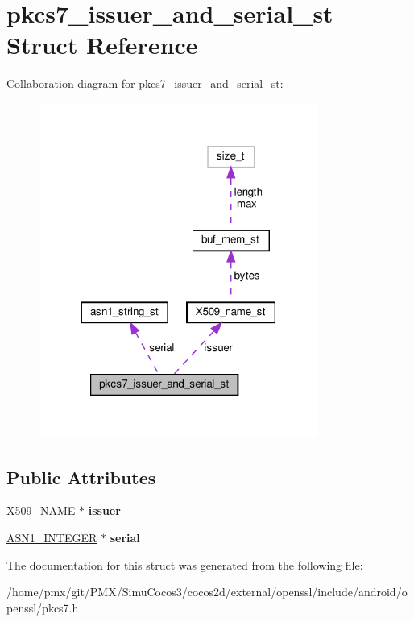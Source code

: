 \hypertarget{structpkcs7__issuer__and__serial__st}{}\section{pkcs7\+\_\+issuer\+\_\+and\+\_\+serial\+\_\+st Struct Reference}
\label{structpkcs7__issuer__and__serial__st}


Collaboration diagram for pkcs7\+\_\+issuer\+\_\+and\+\_\+serial\+\_\+st\+:
\nopagebreak
\begin{figure}[H]
\begin{center}
\leavevmode
\includegraphics[width=260pt]{structpkcs7__issuer__and__serial__st__coll__graph}
\end{center}
\end{figure}
\subsection*{Public Attributes}
\begin{DoxyCompactItemize}
\item 
\mbox{\label{structpkcs7__issuer__and__serial__st_a76bdbdc03f5f9f55043b93069848e49a}} 
\hyperlink{structX509__name__st}{X509\+\_\+\+N\+A\+ME} $\ast$ {\bfseries issuer}
\item 
\mbox{\label{structpkcs7__issuer__and__serial__st_a30d1d6aef8505fc493a3b0f504a51e41}} 
\hyperlink{structasn1__string__st}{A\+S\+N1\+\_\+\+I\+N\+T\+E\+G\+ER} $\ast$ {\bfseries serial}
\end{DoxyCompactItemize}


The documentation for this struct was generated from the following file\+:\begin{DoxyCompactItemize}
\item 
/home/pmx/git/\+P\+M\+X/\+Simu\+Cocos3/cocos2d/external/openssl/include/android/openssl/pkcs7.\+h\end{DoxyCompactItemize}
